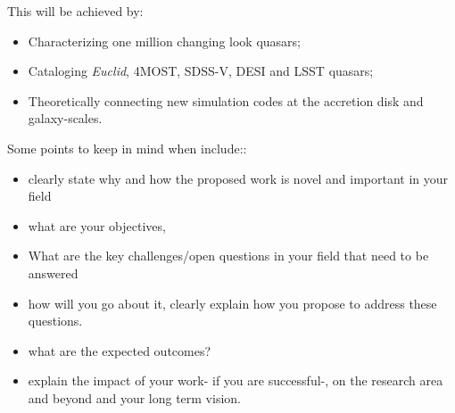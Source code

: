 \smallskip
\smallskip
\noindent
This will be achieved by:
\begin{itemize}
\item Characterizing one million changing look quasars;
\item Cataloging {\it Euclid}, 4MOST, SDSS-V, DESI and LSST quasars; 
\item Theoretically connecting new simulation codes at the accretion disk and galaxy-scales. 
\end{itemize}

\smallskip
\smallskip
\noindent
Some points to keep in mind when include::
\begin{itemize}
\item clearly state why and how the proposed work is novel and important in your field
\item what are your objectives,
\item What are the key challenges/open questions in your field that need to be answered 
\item how will you go about it, clearly explain how you propose to address these questions. 
\item what are the expected outcomes?
\item  explain the impact of your work- if you are successful-, on the research area and beyond and your long term vision.
\end{itemize}

